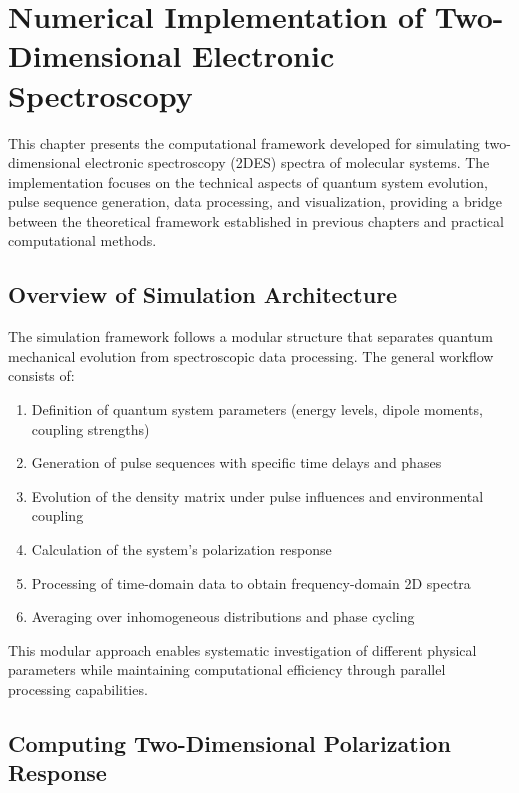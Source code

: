 \chapter{Numerical Implementation of Two-Dimensional Electronic Spectroscopy}
\label{chap:numerical_implementation}

\noindent
This chapter presents the computational framework developed for simulating two-dimensional electronic spectroscopy (2DES) spectra of molecular systems. The implementation focuses on the technical aspects of quantum system evolution, pulse sequence generation, data processing, and visualization, providing a bridge between the theoretical framework established in previous chapters and practical computational methods.

\section{Overview of Simulation Architecture}
\label{sec:simulation_architecture}

\noindent
The simulation framework follows a modular structure that separates quantum mechanical evolution from spectroscopic data processing. The general workflow consists of:

\begin{enumerate}
    \item Definition of quantum system parameters (energy levels, dipole moments, coupling strengths)
    \item Generation of pulse sequences with specific time delays and phases
    \item Evolution of the density matrix under pulse influences and environmental coupling
    \item Calculation of the system's polarization response
    \item Processing of time-domain data to obtain frequency-domain 2D spectra
    \item Averaging over inhomogeneous distributions and phase cycling
\end{enumerate}

\noindent
This modular approach enables systematic investigation of different physical parameters while maintaining computational efficiency through parallel processing capabilities.

\section{Computing Two-Dimensional Polarization Response}
\label{sec:computing_polarization}

